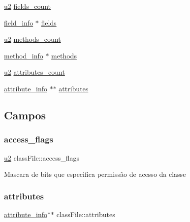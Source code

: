 \begin{DoxyCompactItemize}
\item 
\hyperlink{lista__operandos_8h_a732cde1300aafb73b0ea6c2558a7a54f}{u2} \hyperlink{structclassFile_aab140aacadd635ec42e6117d90f7363a}{fields\+\_\+count}
\item 
\hyperlink{structfield__info}{field\+\_\+info} $\ast$ \hyperlink{structclassFile_af08165230270046ef4f4dcc6fb8133ae}{fields}
\item 
\hyperlink{lista__operandos_8h_a732cde1300aafb73b0ea6c2558a7a54f}{u2} \hyperlink{structclassFile_a8c3eb4279e03c8b8f6525b6dd0ff6126}{methods\+\_\+count}
\item 
\hyperlink{structmethod__info}{method\+\_\+info} $\ast$ \hyperlink{structclassFile_a5417beaa23b6e9d5329dbee87a1f5238}{methods}
\item 
\hyperlink{lista__operandos_8h_a732cde1300aafb73b0ea6c2558a7a54f}{u2} \hyperlink{structclassFile_a9c2f1bdfe0c43e7189f2a7100bec1966}{attributes\+\_\+count}
\item 
\hyperlink{structattribute__info}{attribute\+\_\+info} $\ast$$\ast$ \hyperlink{structclassFile_a49c7b5a9f1718d9a883d3db7eb650757}{attributes}
\end{DoxyCompactItemize}


\subsection{Campos}
\mbox{\label{structclassFile_a78e101546396d4b3d24d89b084b4eadf}} 
\subsubsection{\texorpdfstring{access\+\_\+flags}{access\_flags}}
{\footnotesize\ttfamily \hyperlink{lista__operandos_8h_a732cde1300aafb73b0ea6c2558a7a54f}{u2} class\+File\+::access\+\_\+flags}

Mascara de bits que especifica permissão de acesso da classe \mbox{\label{structclassFile_a49c7b5a9f1718d9a883d3db7eb650757}} 
\subsubsection{\texorpdfstring{attributes}{attributes}}
{\footnotesize\ttfamily \hyperlink{structattribute__info}{attribute\+\_\+info}$\ast$$\ast$ class\+File\+::attributes}

